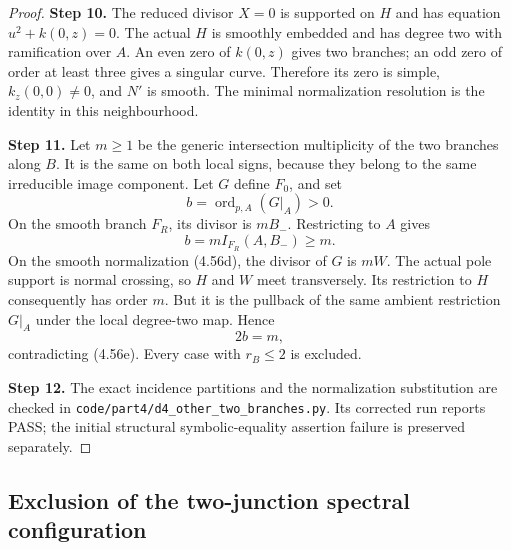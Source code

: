\begin{proof}
\noindent\textbf{Step 10.} The reduced divisor $X=0$ is supported on $H$ and has
equation $u^2+k(0,z)=0$. The actual $H$ is smoothly
embedded and has degree two with ramification over $A$.
An even zero of $k(0,z)$ gives two branches; an odd
zero of order at least three gives a singular curve.
Therefore its zero is simple, $k_z(0,0)\ne0$, and
$N'$ is smooth. The minimal normalization resolution
is the identity in this neighbourhood.

\noindent\textbf{Step 11.} Let $m\ge1$ be the generic intersection multiplicity of
the two branches along $B$. It is the same on both
local signs, because they belong to the same irreducible
image component. Let $G$ define $F_0$, and set
\[
                      b=\operatorname{ord}_{p,A}(G|_A)>0.
\]
On the smooth branch $F_R$, its divisor is $mB_-$.
Restricting to $A$ gives
\[
                 b=m I_{F_R}(A,B_-)\ge m.                \tag{4.56e}
\]
On the smooth normalization (4.56d), the divisor of $G$
is $mW$. The actual pole support is normal crossing,
so $H$ and $W$ meet transversely. Its restriction to
$H$ consequently has order $m$. But it is the pullback
of the same ambient restriction $G|_A$ under the local
degree-two map. Hence
\[
                              2b=m,
\]
contradicting (4.56e). Every case with $r_B\le2$ is
excluded.

\noindent\textbf{Step 12.} The exact incidence partitions and the normalization
substitution are checked in
\texttt{code/part4/d4\_other\_two\_branches.py}.
Its corrected run reports PASS; the initial structural
symbolic-equality assertion failure is preserved separately.
\end{proof}


\subsection{Exclusion of the two-junction spectral configuration}

